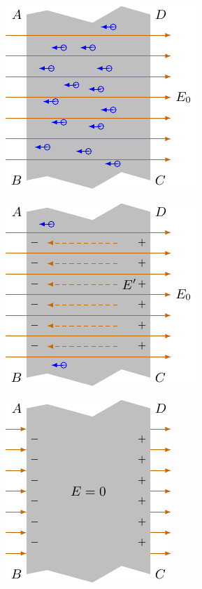 \begin{figure}[htbp]
	\centering
	\begin{subfigure}{0.32\linewidth}
		\centering
		\includegraphics{fig/B/6-12a.pdf}
		\caption{}\label{fig_B_6-12a}
	\end{subfigure}
	\hfil
	\begin{subfigure}{0.32\linewidth}
		\centering
		\includegraphics{fig/B/6-12b.pdf}
		\caption{}\label{fig_B_6-12b}
	\end{subfigure}
	\hfil
	\begin{subfigure}{0.32\linewidth}
		\centering
		\includegraphics{fig/B/6-12c.pdf}
		\caption{}\label{fig_B_6-12c}
	\end{subfigure}
	\caption{}\label{fig_B_6-12}
\end{figure}


